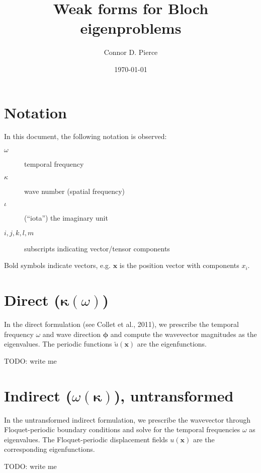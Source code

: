 \documentclass{article}
\title{Weak forms for Bloch eigenproblems}
\author{Connor D. Pierce}
\date{\today}
\newcommand{\imag}{\iota}
\newcommand{\vect}[1]{\boldsymbol{#1}}
\newcommand{\x}{x}
\newcommand{\vecx}{\vect{\x}}
\newcommand{\wavenum}{\kappa}
\newcommand{\wavevec}{\vect{\wavenum}}
\newcommand{\kernel}[1]{\tilde{#1}}
\begin{document}
\maketitle


\section{Notation}

In this document, the following notation is observed:
%
\begin{description}
    \item[$\omega$] temporal frequency
    \item[$\wavenum$] wave number (spatial frequency)
    \item[$\imag$] (``iota'') the imaginary unit
    \item[$i,j,k,l,m$] subscripts indicating vector/tensor components
\end{description}
%
Bold symbols indicate vectors, e.g. \(\vecx\) is the position vector with components \(\x_{i}\).


\section{Direct ($\wavevec(\omega)$)}

In the direct formulation (see Collet et al., 2011), we prescribe the temporal frequency \(\omega\) and wave direction \(\vect{\phi}\) and compute the wavevector magnitudes as the eigenvalues. The periodic functions \(\kernel{u}(\vecx)\) are the eigenfunctions.

\noindent TODO: write me


\section{Indirect ($\omega(\wavevec)$), untransformed}

In the untransformed indirect formulation, we prescribe the wavevector through Floquet-periodic boundary conditions and solve for the temporal frequencies \(\omega\) as eigenvalues. The Floquet-periodic displacement fields \(u(\vecx)\) are the corresponding eigenfunctions.

\noindent TODO: write me
\end{document}
